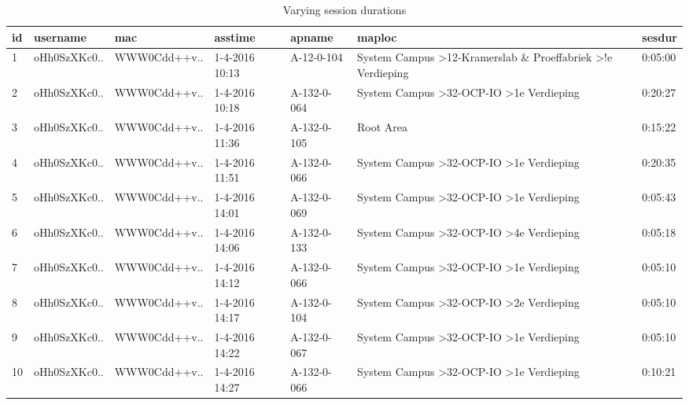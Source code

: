 \begin{table}[H]
	\centering
	\captionsetup{justification=centering}
	\caption{Varying session durations}
	\label{sesdur_example}
	\begin{tabular}{@{}lllllll@{}}
		\toprule
		\textbf{id} & \textbf{username} & \textbf{mac} & \textbf{asstime} & \textbf{apname} & \textbf{maploc}                                                                     & \textbf{sesdur} \\ \midrule
		1           & oHh0SzXKc0..      & WWW0Cdd++v.. & 1-4-2016 10:13   & A-12-0-104      & System Campus \textgreater 12-Kramerslab \& Proeffabriek \textgreater !e Verdieping & 0:05:00         \\
		2           & oHh0SzXKc0..      & WWW0Cdd++v.. & 1-4-2016 10:18   & A-132-0-064     & System Campus \textgreater 32-OCP-IO \textgreater 1e Verdieping                     & 0:20:27         \\
		3           & oHh0SzXKc0..      & WWW0Cdd++v.. & 1-4-2016 11:36   & A-132-0-105     & Root Area                                                                           & 0:15:22         \\
		4           & oHh0SzXKc0..      & WWW0Cdd++v.. & 1-4-2016 11:51   & A-132-0-066     & System Campus \textgreater 32-OCP-IO \textgreater 1e Verdieping                     & 0:20:35         \\
		5           & oHh0SzXKc0..      & WWW0Cdd++v.. & 1-4-2016 14:01   & A-132-0-069     & System Campus \textgreater 32-OCP-IO \textgreater 1e Verdieping                     & 0:05:43         \\
		6           & oHh0SzXKc0..      & WWW0Cdd++v.. & 1-4-2016 14:06   & A-132-0-133     & System Campus \textgreater 32-OCP-IO \textgreater 4e Verdieping                     & 0:05:18         \\
		7           & oHh0SzXKc0..      & WWW0Cdd++v.. & 1-4-2016 14:12   & A-132-0-066     & System Campus \textgreater 32-OCP-IO \textgreater 1e Verdieping                     & 0:05:10         \\
		8           & oHh0SzXKc0..      & WWW0Cdd++v.. & 1-4-2016 14:17   & A-132-0-104     & System Campus \textgreater 32-OCP-IO \textgreater 2e Verdieping                     & 0:05:10         \\
		9           & oHh0SzXKc0..      & WWW0Cdd++v.. & 1-4-2016 14:22   & A-132-0-067     & System Campus \textgreater 32-OCP-IO \textgreater 1e Verdieping                     & 0:05:10         \\
		10          & oHh0SzXKc0..      & WWW0Cdd++v.. & 1-4-2016 14:27   & A-132-0-066     & System Campus \textgreater 32-OCP-IO \textgreater 1e Verdieping                     & 0:10:21         \\ \bottomrule
	\end{tabular}
\end{table}
